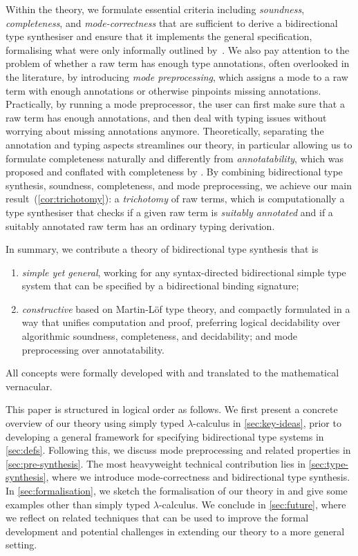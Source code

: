 Within the theory, we formulate essential criteria including \emph{soundness}, \emph{completeness}, and \emph{mode-correctness} that are sufficient to derive a bidirectional type synthesiser and ensure that it implements the general specification, formalising what were only informally outlined by~\citet{Dunfield2021}.
We also pay attention to the problem of whether a raw term has enough type annotations, often overlooked in the literature, by introducing \emph{mode preprocessing}, which assigns a mode to a raw term with enough annotations or otherwise pinpoints missing annotations.
Practically, by running a mode preprocessor, the user can first make sure that a raw term has enough annotations, and then deal with typing issues without worrying about missing annotations anymore.
Theoretically, separating the annotation and typing aspects streamlines our theory, in particular allowing us to formulate completeness naturally and differently from \emph{annotatability}, which was proposed and conflated with completeness by \citet{Dunfield2021}.
By combining bidirectional type synthesis, soundness, completeness, and mode preprocessing, we achieve our main result~(\cref{cor:trichotomy}): a \emph{trichotomy} of raw terms, which is computationally a type synthesiser that checks if a given raw term is \emph{suitably annotated} and if a suitably annotated raw term has an ordinary typing derivation.

In summary, we contribute a theory of bidirectional type synthesis that is
\begin{enumerate}
  \item \emph{simple yet general}, working for any syntax-directed bidirectional simple type system that can be specified by a bidirectional binding signature;
  \item \emph{constructive} based on Martin-L\"of type theory, and compactly formulated in a way that unifies computation and proof, preferring logical decidability over algorithmic soundness, completeness, and decidability; and mode preprocessing over annotatability.
\end{enumerate}
All concepts were formally developed with \Agda and translated to the mathematical vernacular. 

This paper is structured in logical order as follows.
We first present a concrete overview of our theory using simply typed $\lambda$-calculus in \cref{sec:key-ideas}, prior to developing a general framework for specifying bidirectional type systems in \cref{sec:defs}.
Following this, we discuss mode preprocessing and related properties in \cref{sec:pre-synthesis}.
The most heavyweight technical contribution lies in \cref{sec:type-synthesis}, where we introduce mode-correctness and bidirectional type synthesis.
In \cref{sec:formalisation}, we sketch the formalisation of our theory in \Agda and give some examples other than simply typed $\lambda$-calculus.
We conclude in \cref{sec:future}, where we reflect on related techniques that can be used to improve the formal development and potential challenges in extending our theory to a more general setting.

